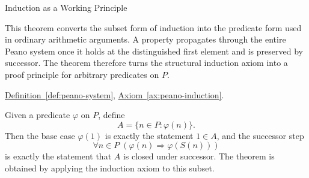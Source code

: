 \begin{topicbox}{Induction as a Working Principle}
\begin{remark*}[Interpretation]
This theorem converts the subset form of induction into the predicate form
used in ordinary arithmetic arguments. A property propagates through the
entire Peano system once it holds at the distinguished first element and is
preserved by successor. The theorem therefore turns the structural induction
axiom into a proof principle for arbitrary predicates on $P$.
\end{remark*}

\begin{remark*}[Dependencies]
\hyperref[def:peano-system]{Definition~\ref*{def:peano-system}},
\hyperref[ax:peano-induction]{Axiom~\ref*{ax:peano-induction}}.
\end{remark*}

\begin{remark*}
Given a predicate $\varphi$ on $P$, define
\[
A=\{n \in P : \varphi(n)\}.
\]
Then the base case $\varphi(1)$ is exactly the statement $1 \in A$, and the
successor step
\[
\forall n \in P\;(\varphi(n) \Longrightarrow \varphi(S(n)))
\]
is exactly the statement that $A$ is closed under successor. The theorem is
obtained by applying the induction axiom to this subset.
\end{remark*}
\end{topicbox}

